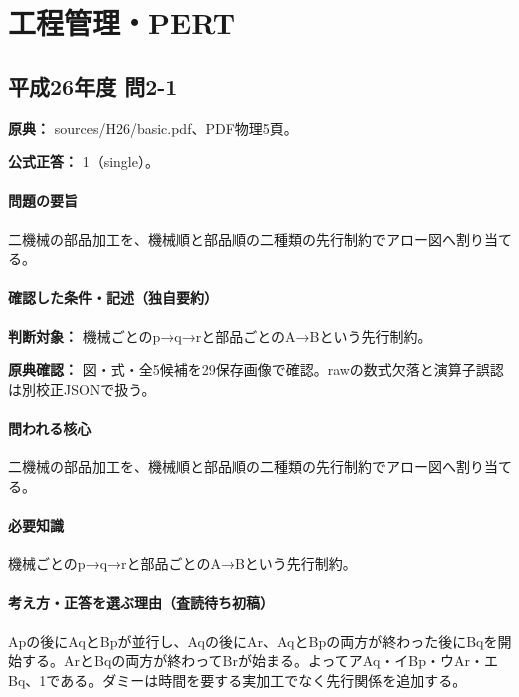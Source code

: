 \section{工程管理・PERT}

\subsection{平成26年度 問2-1}
\label{q:h26-reg-basic-2-1}

\noindent\textbf{原典：} sources/H26/basic.pdf、PDF物理5頁。

\textbf{公式正答：} 1（single）。

\paragraph{問題の要旨} 二機械の部品加工を、機械順と部品順の二種類の先行制約でアロー図へ割り当てる。

\paragraph{確認した条件・記述（独自要約）}\mbox{}\par

\noindent\textbf{判断対象：} 機械ごとのp→q→rと部品ごとのA→Bという先行制約。\par

\noindent\textbf{原典確認：} 図・式・全5候補を29保存画像で確認。rawの数式欠落と演算子誤認は別校正JSONで扱う。\par

\paragraph{問われる核心} 二機械の部品加工を、機械順と部品順の二種類の先行制約でアロー図へ割り当てる。

\paragraph{必要知識} 機械ごとのp→q→rと部品ごとのA→Bという先行制約。

\paragraph{考え方・正答を選ぶ理由（査読待ち初稿）} Apの後にAqとBpが並行し、Aqの後にAr、AqとBpの両方が終わった後にBqを開始する。ArとBqの両方が終わってBrが始まる。よってアAq・イBp・ウAr・エBq、1である。ダミーは時間を要する実加工でなく先行関係を追加する。

